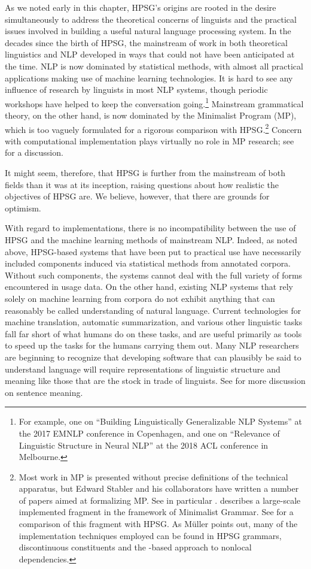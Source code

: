 \documentclass[output=paper,biblatex,babelshorthands,newtxmath,draftmode,colorlinks,citecolor=brown]{langscibook}
\begin{document}
As we noted early in this chapter, HPSG's origins are rooted in the desire simultaneously to address
the theoretical concerns of linguists and the practical issues involved in building a useful natural
language processing system.  In the decades since the birth of HPSG, the mainstream of work in both
theoretical linguistics and NLP developed in ways that could not have been anticipated at the time.
NLP is now dominated by statistical methods, with almost all practical applications making use of
machine learning technologies.  It is hard to see any influence of research by linguists in most NLP
systems, though periodic workshops have helped to keep the conversation going.\footnote{For example,
  one on ``Building Linguistically Generalizable NLP Systems'' at the 2017 EMNLP conference in
  Copenhagen, and one on ``Relevance of Linguistic Structure in Neural NLP'' at the 2018 ACL
  conference in Melbourne.}  Mainstream grammatical theory, on the other hand, is now dominated by
the Minimalist Program (MP), which is too vaguely formulated for a rigorous comparison with
HPSG.\footnote{Most work in MP is presented without precise definitions of the technical apparatus,
  but Edward Stabler and his collaborators have written a number of papers aimed at formalizing
  MP. See in particular \citet{CollStab2016}. \citet{Torr2019a-u} describes a large-scale
  implemented fragment in the framework of Minimalist Grammar. See 
  for a comparison of this fragment with HPSG. As Müller points out, many of the implementation
  techniques employed can be found in HPSG grammars, \eg discontinuous constituents and the
  \slasch-based approach to nonlocal dependencies.}   Concern with computational implementation
plays virtually no role in MP research; see \citet{MuellerGT-Eng1} for a discussion. 

It might seem, therefore, that HPSG is further from the mainstream of both fields than it was at its inception, raising questions about how realistic the objectives of HPSG are.  We believe, however, that there are grounds for optimism.

With regard to implementations, there is no incompatibility between the use of HPSG and the machine learning methods of mainstream NLP.  Indeed, as noted above, HPSG-based systems that have been put to practical use have necessarily included components induced via statistical methods from annotated corpora.  Without such components, the systems cannot deal with the full variety of forms encountered in usage data.  On the other hand, existing NLP systems that rely solely on machine learning from corpora do not exhibit anything that can reasonably be called understanding of natural language.  Current technologies for machine translation, automatic summarization, and various other linguistic tasks fall far short of what humans do on these tasks, and are useful primarily as tools to speed up the tasks for the humans carrying them out.  Many NLP researchers are beginning to recognize that developing software that can plausibly be said to understand language will require representations of linguistic structure and meaning like those that are the stock in trade of linguists.  See \citet*{Bender2015LayersOI} for more discussion on sentence meaning.
\end{document}
